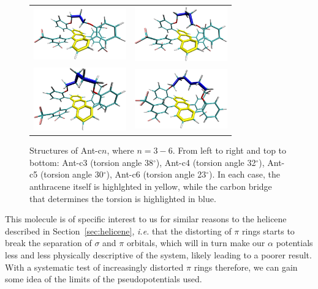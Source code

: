 \documentclass[aip,reprint,nofootinbib]{revtex4-1}
\begin{document}
\begin{figure}
\begin{center}
\begin{tabular}{c c}
\includegraphics[width=4cm]{c3-highlights} & \includegraphics[width=4cm]{c4-highlights} \\
\includegraphics[width=4cm]{c5-highlights} &
\includegraphics[width=4cm]{c6-highlights} \\
\end{tabular} 
\end{center}
\caption[Twistacene structure diagrams.]{Structures of Ant-c$n$, where $n=3-6$. From left to right and top to bottom: Ant-c3 (torsion angle 38$^{\circ}$), Ant-c4 (torsion angle 32$^{\circ}$), Ant-c5 (torsion angle 30$^{\circ}$), Ant-c6 (torsion angle 23$^{\circ}$). In each case, the anthracene itself is highlghted in yellow, while the carbon bridge that determines the torsion is highlighted in blue.}\label{fig:tetheredanthracene}
\end{figure}

This molecule is of specific interest to us for similar reasons to the helicene described in Section~\ref{sec:helicene}, \emph{i.e.} that the distorting of $\pi$ rings starts to break the separation of $\sigma$ and $\pi$ orbitals, which will in turn make our $\alpha$ potentials less and less physically descriptive of the system, likely leading to a poorer result. With a systematic test of increasingly distorted $\pi$ rings therefore, we can gain some idea of the limits of the pseudopotentials used.
\end{document}
